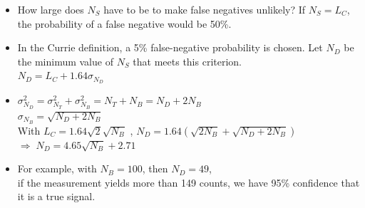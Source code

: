 \begin{enumerate}
\begin{enumerate}
\begin{itemize}
            \item How large does $N_S$ have to be to make false negatives unlikely? If $N_S=L_C$, the probability of a false negative would be 50\%.
            \item In the Currie definition, a 5\% false-negative probability is chosen. Let $N_D$ be the minimum value of $N_S$ that meets this criterion.\\
            $N_D=L_C+1.64\sigma_{N_D}$
            \item $\sigma^2_{N_D}=\sigma^2_{N_T}+\sigma^2_{N_B}=N_T+N_B=N_D+2N_B$\\
            $\sigma_{N_B}=\sqrt{N_D+2N_B}$\\
            With $L_C=1.64\sqrt{2}\sqrt{N_B}$ , $N_D=1.64(\sqrt{2N_B}+\sqrt{N_D+2N_B})$\\
            $\Rightarrow\;N_D=4.65\sqrt{N_B}+2.71$
            \item For example, with $N_B=100$, then $N_D=49$,\\
            if the measurement yields more than 149 counts, we have 95\% confidence that it is a true signal. 
        \end{itemize}
    \end{enumerate}
\end{enumerate}